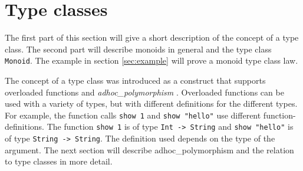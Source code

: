 \section{Type classes}
\label{sec:typeclasses}

The first part of this section will give a short description of the concept of a type class. The second part will describe monoids in general and the type class \verb|Monoid|. The example in section \ref{sec:example} will prove a monoid type class law. 

The concept of a type class was introduced as a construct that supports overloaded functions and \emph{\gls{adhoc_polymorphism}} \cite{Wadler}. Overloaded functions can be used with a variety of types, but with different definitions for the different types. For example, the function calls \verb|show 1| and \verb|show "hello"| use different \glspl{function-definition}. The function \verb|show 1| is of type \verb|Int -> String| and \verb|show "hello"| is of type \verb|String -> String|. The definition used depends on the type of the argument.  The next section will describe \gls{adhoc_polymorphism} and the relation to type classes in more detail.

